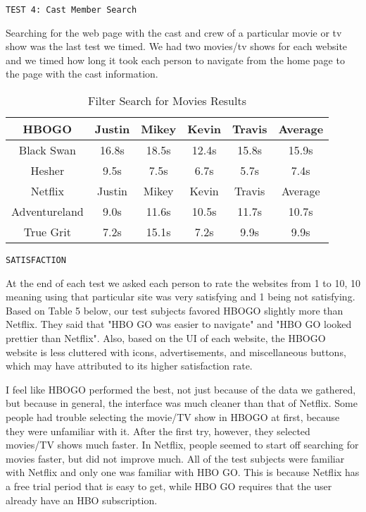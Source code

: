 \documentclass[11pt]{article}
\begin{document}
\begin{verbatim}
TEST 4: Cast Member Search
\end{verbatim}
Searching for the web page with the cast and crew of a particular movie or tv show was the last test we timed. We had two movies/tv shows for each website and we timed how long it took each person to navigate from the home page to the page with the cast information.

\begin{table}[ht]
\caption{Filter Search for Movies Results} 				%
\centering 									%
\begin{tabular}{|c|c c c c|c|} %
\hline\hline 									%
HBOGO  &Justin& Mikey&Kevin&Travis&Average  \\ [0.5ex] 	    %
\hline 									    %
Black Swan  &16.8s & 18.5s&12.4s&15.8s&15.9s          \\			 %
Hesher &9.5s&7.5s&6.7s&5.7s&7.4s                             \\
\hline
Netflix &Justin& Mikey&Kevin&Travis&Average   \\ [0.5ex] 			%
\hline
Adventureland &9.0s&11.6s&10.5s&11.7s&10.7s          \\
True Grit &7.2s&15.1s&7.2s&9.9s&9.9s                         \\
\hline 										%
\end{tabular}
\label{table:nonlin} %
\end{table}

\begin{verbatim}
SATISFACTION
\end{verbatim}
At the end of each test we asked each person to rate the websites from 1 to 10, 10 meaning using that particular site was very satisfying and 1 being not satisfying. Based on Table 5 below, our test subjects favored HBOGO slightly more than Netflix. They said that "HBO GO was easier to navigate" and "HBO GO looked prettier than Netflix". Also, based on the UI of each website, the HBOGO website is less cluttered with icons, advertisements, and miscellaneous buttons, which may have attributed to its higher satisfaction rate.

I feel like HBOGO performed the best, not just because of the data we gathered, but because in general, the interface was much cleaner than that of Netflix. Some people had trouble selecting the movie/TV show in HBOGO at first, because they were unfamiliar with it. After the first try, however, they selected movies/TV shows much faster. In Netflix, people seemed to start off searching for movies faster, but did not improve much. All of the test subjects were familiar with Netflix and only one was familiar with HBO GO. This is because Netflix has a free trial period that is easy to get, while HBO GO requires that the user already have an HBO subscription.
\end{document}
